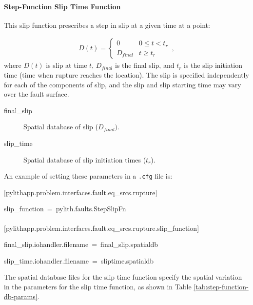 \paragraph{Step-Function Slip Time Function}

This slip function prescribes a step in slip at a given time at a
point: 

\begin{gather}
D(t)=\left\{ \begin{array}{cc}
0 & 0\leq t<t_{r}\\
D_{final} & t\ge t_{r}
\end{array}\right.\,,
\end{gather}
where $D(t)$ is slip at time $t$, $D_{final}$ is the final slip,
and $t_{r}$ is the slip initiation time (time when rupture reaches
the location). The slip is specified independently for each of the
components of slip, and the slip and slip starting time may vary over
the fault surface.
\begin{description}
\item [{final\_slip}] Spatial database of slip ($D_{final})$.
\item [{slip\_time}] Spatial database of slip initiation times ($t_{r}$).
\end{description}
An example of setting these parameters in a \texttt{.cfg} file is:
\begin{lyxcode}
{[}pylithapp.problem.interfaces.fault.eq\_srcs.rupture{]}

slip\_function~=~pylith.faults.StepSlipFn~\\
~\\
{[}pylithapp.problem.interfaces.fault.eq\_srcs.rupture.slip\_function{]}

final\_slip.iohandler.filename~=~final\_slip.spatialdb

slip\_time.iohandler.filename~=~sliptime.spatialdb
\end{lyxcode}
The spatial database files for the slip time function specify the
spatial variation in the parameters for the slip time function, as
shown in Table \ref{tab:step-function-db-params}.

